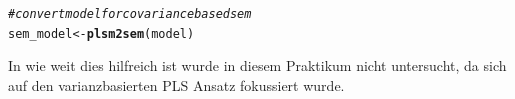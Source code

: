 \documentclass{article}\usepackage[]{graphicx}\usepackage[]{color}
\makeatletter
\newcommand{\hlcom}[1]{\textcolor[rgb]{0.678,0.584,0.686}{\textit{#1}}}%
\newcommand{\hlstd}[1]{\textcolor[rgb]{0.345,0.345,0.345}{#1}}%
\newcommand{\hlkwb}[1]{\textcolor[rgb]{0.69,0.353,0.396}{#1}}%
\newcommand{\hlkwd}[1]{\textcolor[rgb]{0.737,0.353,0.396}{\textbf{#1}}}%
\newenvironment{kframe}{%
 \def\at@end@of@kframe{}%
 \ifinner\ifhmode%
  \def\at@end@of@kframe{\end{minipage}}%
  \begin{minipage}{\columnwidth}%
 \fi\fi%
 \def\FrameCommand##1{\hskip\@totalleftmargin \hskip-\fboxsep
 \colorbox{shadecolor}{##1}\hskip-\fboxsep
     \hskip-\linewidth \hskip-\@totalleftmargin \hskip\columnwidth}%
 \MakeFramed {\advance\hsize-\width
   \@totalleftmargin\z@ \linewidth\hsize
   \@setminipage}}%
 {\par\unskip\endMakeFramed%
 \at@end@of@kframe}
\newenvironment{knitrout}{}{} %
\makeatother
\begin{document}
\begin{knitrout}
\color{fgcolor}\begin{kframe}
\begin{alltt}
\hlcom{#convert model for covariance based sem}
\hlstd{sem_model} \hlkwb{<-} \hlkwd{plsm2sem}\hlstd{(model)}
\end{alltt}


{\ttfamily\noindent\itshape\color{messagecolor}{\#\# Loading required package: sem\\\#\# \\\#\# Attaching package: 'sem'\\\#\# \\\#\# Das folgende Objekt ist maskiert from 'package:semPLS':\\\#\# \\\#\#\ \ \ \  pathDiagram}}

{\ttfamily\noindent\bfseries\color{errorcolor}{\#\# Error: kann aus dieser Verbindung nicht lesen}}\end{kframe}
\end{knitrout}
In wie weit dies hilfreich ist wurde in diesem Praktikum nicht untersucht, da sich auf den varianzbasierten PLS Ansatz fokussiert wurde.
\end{document}
